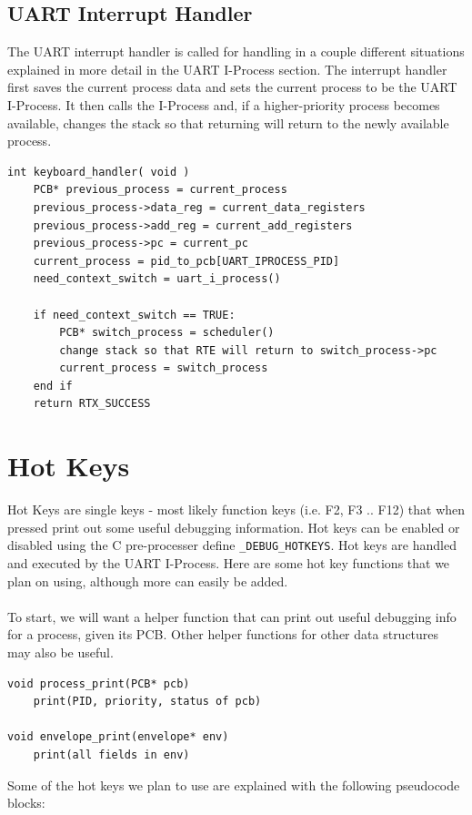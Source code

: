 \documentclass[titlepage]{article}
\begin{document}
\subsection{UART Interrupt Handler}
The UART interrupt handler is called for handling in a couple different
situations explained in more detail in the UART I-Process section.  The
interrupt handler first saves the current process data and sets the current
process to be the UART I-Process.  It then calls the I-Process and, if a
higher-priority process becomes available, changes the stack so that returning
will return to the newly available process.

\begin{verbatim}
int keyboard_handler( void )
    PCB* previous_process = current_process
    previous_process->data_reg = current_data_registers
    previous_process->add_reg = current_add_registers
    previous_process->pc = current_pc
    current_process = pid_to_pcb[UART_IPROCESS_PID]
    need_context_switch = uart_i_process()

    if need_context_switch == TRUE:
        PCB* switch_process = scheduler()
        change stack so that RTE will return to switch_process->pc
        current_process = switch_process
    end if
    return RTX_SUCCESS
\end{verbatim}

\section{Hot Keys}
Hot Keys are single keys - most likely function keys (i.e. F2, F3 .. F12) that
when pressed print out some useful debugging information.  Hot keys can be
enabled or disabled using the C pre-processer define \verb!_DEBUG_HOTKEYS!.
Hot keys are handled and executed by the UART I-Process.  Here are some hot key
functions that we plan on using, although more can easily be added.\\
\\
To start, we will want a helper function that can print out useful debugging
info for a process, given its PCB.  Other helper functions for other data
structures may also be useful.

\begin{verbatim}
void process_print(PCB* pcb)
    print(PID, priority, status of pcb)

void envelope_print(envelope* env)
    print(all fields in env)
\end{verbatim}

Some of the hot keys we plan to use are explained with the following pseudocode
blocks:
\end{document}
